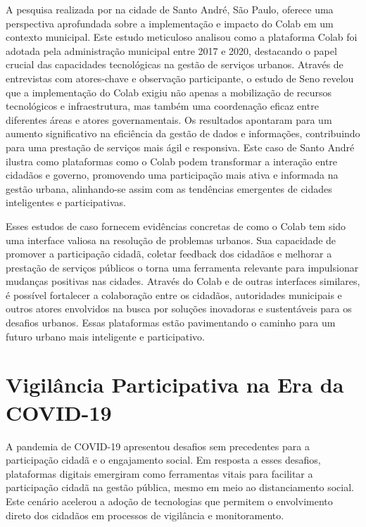 A pesquisa realizada por  na cidade de Santo André, São Paulo, oferece uma perspectiva aprofundada sobre a implementação e impacto do Colab em um contexto municipal. Este estudo meticuloso analisou como a plataforma Colab foi adotada pela administração municipal entre 2017 e 2020, destacando o papel crucial das capacidades tecnológicas na gestão de serviços urbanos. Através de entrevistas com atores-chave e observação participante, o estudo de Seno revelou que a implementação do Colab exigiu não apenas a mobilização de recursos tecnológicos e infraestrutura, mas também uma coordenação eficaz entre diferentes áreas e atores governamentais. Os resultados apontaram para um aumento significativo na eficiência da gestão de dados e informações, contribuindo para uma prestação de serviços mais ágil e responsiva. Este caso de Santo André ilustra como plataformas como o Colab podem transformar a interação entre cidadãos e governo, promovendo uma participação mais ativa e informada na gestão urbana, alinhando-se assim com as tendências emergentes de cidades inteligentes e participativas.

Esses estudos de caso fornecem evidências concretas de como o Colab tem sido uma interface valiosa na resolução de problemas urbanos. Sua capacidade de promover a participação cidadã, coletar feedback dos cidadãos e melhorar a prestação de serviços públicos o torna uma ferramenta relevante para impulsionar mudanças positivas nas cidades. Através do Colab e de outras interfaces similares, é possível fortalecer a colaboração entre os cidadãos, autoridades municipais e outros atores envolvidos na busca por soluções inovadoras e sustentáveis para os desafios urbanos. Essas plataformas estão pavimentando o caminho para um futuro urbano mais inteligente e participativo.

\section{Vigilância Participativa na Era da COVID-19}

A pandemia de COVID-19 apresentou desafios sem precedentes para a participação cidadã e o engajamento social. Em resposta a esses desafios, plataformas digitais emergiram como ferramentas vitais para facilitar a participação cidadã na gestão pública, mesmo em meio ao distanciamento social. Este cenário acelerou a adoção de tecnologias que permitem o envolvimento direto dos cidadãos em processos de vigilância e monitoramento.

